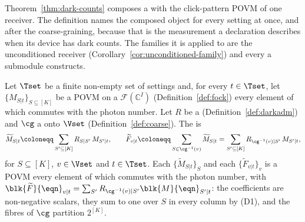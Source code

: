 
Theorem~\ref{thm:dark-counts} composes a  with the
click-pattern POVM of one receiver. The definition names the composed object
for every setting at once, and after the coarse-graining, because that is the
measurement a declaration describes when its device has dark counts. The
families it is applied to are the unconditioned receiver
(Corollary~\ref{cor:unconditioned-family}) and every  a
submodule constructs.

\begin{definition}\label{def:dark-composed}
Let $\Tset$ be a finite non-empty set of settings and, for every $t\in\Tset$,
let $\{M_{S|t}\}_{S\subseteq[K]}$ be a POVM on a 
$\mathcal{F}(\mathbb{C}^{I})$ (Definition~\ref{def:fock}) every element of
which commutes with the photon number. Let $R$ be a
 (Definition~\ref{def:darkadm}) and $\cg$ a
 onto $\Vset$ (Definition~\ref{def:coarse}).
The
 is
\begin{equation}\label{eq:dark-composed}
  \widetilde M_{S|t}\coloneqq\sum_{S'\subseteq[K]}R_{S|S'}\,M_{S'|t},
  \qquad
  \widetilde F_{v|t}\coloneqq\sum_{S\in\cg^{-1}(v)}\widetilde M_{S|t}
  =\sum_{S'\subseteq[K]}R_{\cg^{-1}(v)|S'}\,M_{S'|t},
\end{equation}
for $S\subseteq[K]$, $v\in\Vset$ and $t\in\Tset$. Each
$\{\widetilde M_{S|t}\}_S$ and each $\{\widetilde F_{v|t}\}_v$ is a POVM
every element of which commutes with the photon number, with
$\blk{\widetilde F}{\eqn}_{v|t}=\sum_{S'}R_{\cg^{-1}(v)|S'}\blk{M}{\eqn}_{S'|t}$:
the coefficients are non-negative scalars, they sum to one over $S$ in every
column by (D1), and the fibres of $\cg$ partition $2^{[K]}$.
\end{definition}
